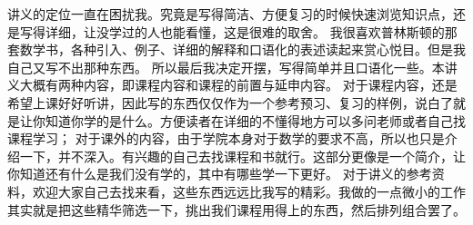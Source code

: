 \documentclass[12pt, a4paper, oneside]{ctexbook}
\begin{document}
讲义的定位一直在困扰我。究竟是写得简洁、方便复习的时候快速浏览知识点，还是写得详细，让没学过的人也能看懂，这是很难的取舍。
我很喜欢普林斯顿的那套数学书，各种引入、例子、详细的解释和口语化的表述读起来赏心悦目。但是我自己又写不出那种东西。
所以最后我决定开摆，写得简单并且口语化一些。本讲义大概有两种内容，即课程内容和课程的前置与延申内容。
对于课程内容，还是希望上课好好听讲，因此写的东西仅仅作为一个参考预习、复习的样例，说白了就是让你知道你学的是什么。方便读者在详细的不懂得地方可以多问老师或者自己找课程学习；
对于课外的内容，由于学院本身对于数学的要求不高，所以也只是介绍一下，并不深入。有兴趣的自己去找课程和书就行。这部分更像是一个简介，让你知道还有什么是我们没有学的，其中有哪些学一下更好。
对于讲义的参考资料，欢迎大家自己去找来看，这些东西远远比我写的精彩。我做的一点微小的工作其实就是把这些精华筛选一下，挑出我们课程用得上的东西，然后排列组合罢了。\\
\end{document}
